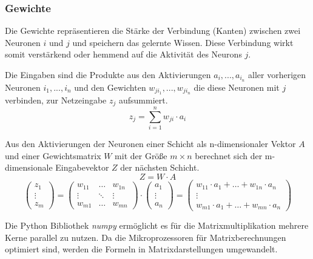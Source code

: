 \documentclass[12pt, a4paper]{article}
\begin{document}
\subsubsection{Gewichte}
Die Gewichte repräsentieren die Stärke der Verbindung (Kanten) zwischen zwei Neuronen \(i\) und \(j\) und speichern das gelernte Wissen. Diese Verbindung wirkt somit  verstärkend oder hemmend auf die Aktivität des Neurons \(j\).

Die Eingaben sind die Produkte aus den Aktivierungen \(a_{i},...,a_{i_{n}}\) aller vorherigen Neuronen \(i_{1},...,i_{n}\) und den Gewichten \(w_{ji_{1}},...,w_{ji_{n}}\) die diese Neuronen mit \(j\) verbinden, zur Netzeingabe \(z_{j}\) aufsummiert. \cite[S.~37]{dkriesel:paper}
\[z_{j} = \sum_{i = 1}^{n} w_{ji} \cdot a_{i}\]

Aus den Aktivierungen der Neuronen einer Schicht als n-dimensionaler Vektor \(A\) und einer Gewichtsmatrix \(W\) mit der Größe \(m \times n\) berechnet sich der m-dimensionale Eingabevektor \(Z\) der nächsten Schicht.
\[Z = W \cdot A\]
\[
\begin{pmatrix}
z_{1} \\
\vdots \\
z_{m}
\end{pmatrix}
 = 
\begin{pmatrix}
w_{11} & \dots & w_{1n} \\
\vdots & \ddots & \vdots \\
w_{m1} & \dots & w_{mn}
\end{pmatrix}
 \cdot
\begin{pmatrix}
a_{1} \\
\vdots \\
a_{n}
\end{pmatrix} 
=
\begin{pmatrix}
w_{11} \cdot a_{1} +\dots + w_{1n} \cdot a_{n} \\
\vdots \\
w_{m1} \cdot a_{1} + \dots + w_{mn} \cdot a_{n}
\end{pmatrix} 
\]

Die Python Bibliothek \textit{numpy} ermöglicht es für die Matrixmultiplikation mehrere Kerne parallel zu nutzen. Da die Mikroprozessoren für Matrixberechnungen optimiert sind, werden die Formeln in Matrixdarstellungen umgewandelt.
\end{document}
